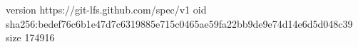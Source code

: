 version https://git-lfs.github.com/spec/v1
oid sha256:bedef76c6b1e47d7c6319885e715c0465ae59fa22bb9de9e74d14e6d5d048c39
size 174916
